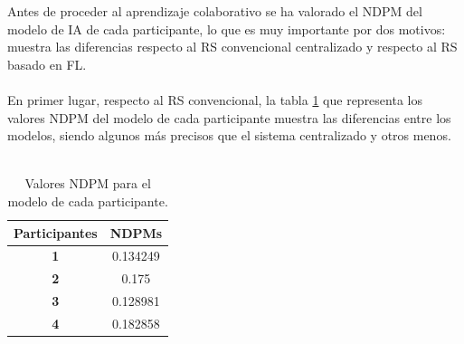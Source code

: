 Antes de proceder al aprendizaje colaborativo se ha valorado el NDPM del modelo de IA de cada participante, lo que es muy importante por dos motivos: muestra las diferencias respecto al RS convencional centralizado y respecto al RS basado en FL. 
\\ \\
En primer lugar, respecto al RS convencional, la tabla \ref{tab:NDPM_PARTICIPANTES} que representa los valores NDPM del modelo de cada participante muestra las diferencias entre los modelos, siendo algunos más precisos que el sistema centralizado y otros menos.
\\\\
\begin{table}[H]
    \begin{center}
        \begin{tabular}{|c|c|}
            \hline
            \rowcolor{Cyan} 
            \textbf{Participantes} & \textbf{NDPMs} \\ 
            \hline
            \textbf{1} & 0.134249 \\
            \hline
            \rowcolor{GrisTabla}
            \textbf{2} & 0.175 \\
            \hline
            \textbf{3} & 0.128981 \\
            \hline
            \rowcolor{GrisTabla}
            \textbf{4} & 0.182858 \\
            \hline
        \end{tabular}
        \caption{\centering Valores NDPM para el modelo de cada participante.}\label{tab:NDPM_PARTICIPANTES}
    \end{center}    
\end{table}

